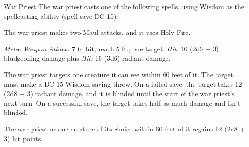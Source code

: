 \documentclass[10pt,a4paper,twoside,bg=print,twocolumn,openany,nodeprecatedcode]{dndbook}
\begin{document}
\begin{DndMonster}[float=t]{War Priest}
\DndMonsterBasics[
armor-class = {18 (plate armor)},
hit-points = {\DndDice{18d8 + 36}},
speed = {30 ft.}
]
\DndMonsterAbilityScores[
 str = 16,
 dex = 10,
 con = 14,
 int = 11,
 wis = 17,
 cha = 13
]
\DndMonsterDetails[
saving-throws = {Con +6, Wis +7},
skills = {Intimidation +5, Religion +4},
languages = {any two languages},
challenge = 9,
]
The war priest casts one of the following spells, using Wisdom as the spellcasting ability (spell save DC 15):
\begin{DndMonsterSpells}
\end{DndMonsterSpells}
The war priest makes two Maul attacks, and it uses Holy Fire.

\textsl{Melee Weapon Attack:} 7 to hit, reach 5 ft., one target. \textsl{Hit:} 10 (2d6 + 3) bludgeoning damage  plus \textsl{Hit:} 10 (3d6) radiant damage.

The war priest targets one creature it can see within 60 feet of it. The target must make a DC 15 Wisdom saving throw. On a failed save, the target takes 12 (2d8 + 3) radiant damage, and it is blinded until the start of the war priest's next turn. On a successful save, the target takes half as much damage and isn't blinded.

The war priest or one creature of its choice within 60 feet of it regains 12 (2d8 + 3) hit points.

\end{DndMonster}
\end{document}
